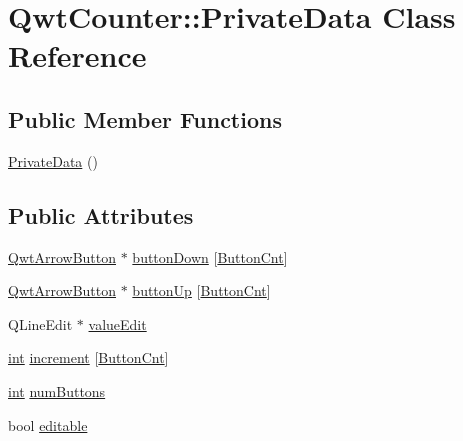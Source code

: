 \hypertarget{class_qwt_counter_1_1_private_data}{\section{Qwt\-Counter\-:\-:Private\-Data Class Reference}
\label{class_qwt_counter_1_1_private_data}
}
\subsection*{Public Member Functions}
\begin{DoxyCompactItemize}
\item 
\hyperlink{class_qwt_counter_1_1_private_data_a68acccac3c5c6cae784fe1a1fac60367}{Private\-Data} ()
\end{DoxyCompactItemize}
\subsection*{Public Attributes}
\begin{DoxyCompactItemize}
\item 
\hyperlink{class_qwt_arrow_button}{Qwt\-Arrow\-Button} $\ast$ \hyperlink{class_qwt_counter_1_1_private_data_a1ed06bf9ca11fff029ce65caa2a6f390}{button\-Down} \mbox{[}\hyperlink{class_qwt_counter_a027cfd91946ca9a19a1d606411e0f374aca8e93a2d129f7cc91f54f5f4da20c5f}{Button\-Cnt}\mbox{]}
\item 
\hyperlink{class_qwt_arrow_button}{Qwt\-Arrow\-Button} $\ast$ \hyperlink{class_qwt_counter_1_1_private_data_af613969fc62f4c377dff9e3775b30345}{button\-Up} \mbox{[}\hyperlink{class_qwt_counter_a027cfd91946ca9a19a1d606411e0f374aca8e93a2d129f7cc91f54f5f4da20c5f}{Button\-Cnt}\mbox{]}
\item 
Q\-Line\-Edit $\ast$ \hyperlink{class_qwt_counter_1_1_private_data_af950175bf792a26e9b447a24f8bf705c}{value\-Edit}
\item 
\hyperlink{ioapi_8h_a787fa3cf048117ba7123753c1e74fcd6}{int} \hyperlink{class_qwt_counter_1_1_private_data_ad0bc014bedf552cdc97d92dafea329dd}{increment} \mbox{[}\hyperlink{class_qwt_counter_a027cfd91946ca9a19a1d606411e0f374aca8e93a2d129f7cc91f54f5f4da20c5f}{Button\-Cnt}\mbox{]}
\item 
\hyperlink{ioapi_8h_a787fa3cf048117ba7123753c1e74fcd6}{int} \hyperlink{class_qwt_counter_1_1_private_data_a9e148926576573156cf7740b1bfc720d}{num\-Buttons}
\item 
bool \hyperlink{class_qwt_counter_1_1_private_data_adcf4b5f3d63b92fd0fd22783d3e1fe2f}{editable}
\end{DoxyCompactItemize}


